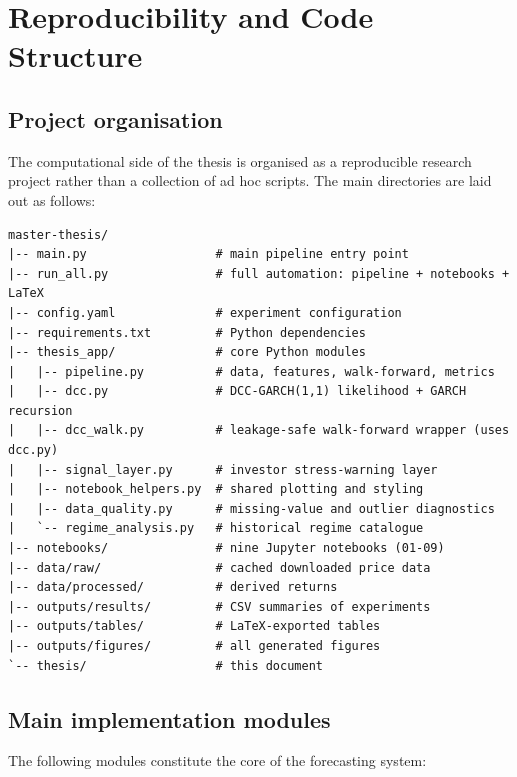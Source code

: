 \section{Reproducibility and Code Structure}
\label{app:reproducibility}

\subsection{Project organisation}

The computational side of the thesis is organised as a reproducible research project rather than a collection of ad hoc scripts. The main directories are laid out as follows:

\begin{lstlisting}[language={}, caption={Top-level project directory structure.}, label=lst:dirstructure]
master-thesis/
|-- main.py                  # main pipeline entry point
|-- run_all.py               # full automation: pipeline + notebooks + LaTeX
|-- config.yaml              # experiment configuration
|-- requirements.txt         # Python dependencies
|-- thesis_app/              # core Python modules
|   |-- pipeline.py          # data, features, walk-forward, metrics
|   |-- dcc.py               # DCC-GARCH(1,1) likelihood + GARCH recursion
|   |-- dcc_walk.py          # leakage-safe walk-forward wrapper (uses dcc.py)
|   |-- signal_layer.py      # investor stress-warning layer
|   |-- notebook_helpers.py  # shared plotting and styling
|   |-- data_quality.py      # missing-value and outlier diagnostics
|   `-- regime_analysis.py   # historical regime catalogue
|-- notebooks/               # nine Jupyter notebooks (01-09)
|-- data/raw/                # cached downloaded price data
|-- data/processed/          # derived returns
|-- outputs/results/         # CSV summaries of experiments
|-- outputs/tables/          # LaTeX-exported tables
|-- outputs/figures/         # all generated figures
`-- thesis/                  # this document
\end{lstlisting}

\subsection{Main implementation modules}

The following modules constitute the core of the forecasting system:

